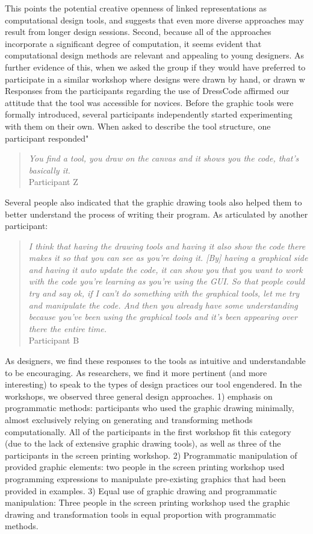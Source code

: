 \documentclass{sigchi}
\begin{document}
 This points the potential creative openness of linked representations as computational design tools, and suggests that even more diverse approaches may result from longer design sessions. Second, because all of the approaches incorporate a significant degree of computation, it seems evident that computational design methods are relevant and appealing to young designers. As further evidence of this, when we asked the group if they would have preferred to participate in a similar workshop where designs were drawn by hand, or drawn w
Responses from the participants regarding the use of DressCode affirmed our attitude that the tool was accessible for novices. Before the graphic tools were formally introduced, several participants independently started experimenting with them on their own.  When asked to describe the tool structure, one participant responded"
\begin{quotation}
\textit{You find a tool, you draw on the canvas and it shows you the code, that's basically it.}
\\Participant Z
\end{quotation}
Several people also indicated that the graphic drawing tools also helped them to better understand the process of writing their program. As articulated by another participant:
\begin{quotation}
\textit{I think that having the drawing tools and having it also show the code there makes it so that you can see as you're doing it. [By] having a graphical side and having it auto update the code, it can show you that you want to work with the code you're learning as you're using the GUI. So that people could try and say ok, if I can't do something with the graphical tools, let me try and manipulate the code. And then you already have some understanding because you've been using the graphical tools and it's been appearing over there the entire time.}
\\Participant B
\end{quotation}
As designers, we find these responses to the tools as intuitive and understandable to be encouraging. As researchers, we find it more pertinent (and more interesting) to speak to the types of design practices our tool engendered. In the workshops, we observed three general design approaches. 1) emphasis on programmatic methods: participants who used the graphic drawing minimally, almost exclusively relying on generating and transforming methods computationally. All of the participants in the first workshop fit this category (due to the lack of extensive graphic drawing tools), as well as three of the participants in the screen printing workshop. 2) Programmatic manipulation of provided graphic elements: two people in the screen printing workshop used programming expressions to manipulate pre-existing graphics that had been provided in examples. 3) Equal use of graphic drawing and programmatic manipulation: Three people in the screen printing workshop used the graphic drawing and transformation tools in equal proportion with programmatic methods.
\end{document}
